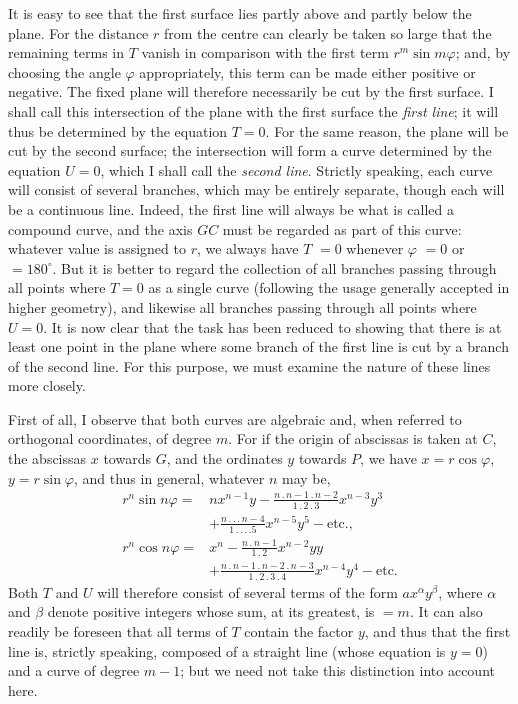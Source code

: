 It is easy to see that the first surface lies partly above and partly below the plane. For the distance $r$ from the centre can clearly be taken so large that the remaining terms in $T$ vanish in comparison with the first term $r^m\sin m\varphi$; and, by choosing the angle $\varphi$ appropriately, this term can be made either positive or negative. The fixed plane will therefore necessarily be cut by the first surface. I shall call this intersection of the plane with the first surface the \textit{first line}; it will thus be determined by the equation $T=0$. For the same reason, the plane will be cut by the second surface; the intersection will form a curve determined by the equation $U=0$, which I shall call the \textit{second line}. Strictly speaking, each curve will consist of several branches, which may be entirely separate, though each will be a continuous line. Indeed, the first line will always be what is called a compound curve, and the axis $GC$ must be regarded as part of this curve: whatever value is assigned to $r$, we always have $T$ $=0$ whenever $\varphi$ $=0$ or $=180^{\circ}$. But it is better to regard the collection of all branches passing through all points where $T=0$ as a single curve (following the usage generally accepted in higher geometry), and likewise all branches passing through all points where $U=0$. It is now clear that the task has been reduced to showing that there is at least one point in the plane where some branch of the first line is cut by a branch of the second line. For this purpose, we must examine the nature of these lines more closely.

First of all, I observe that both curves are algebraic and, when referred to orthogonal coordinates, of degree $m$. For if the origin of abscissas is taken at $C$, the abscissas $x$ towards $G$, and the ordinates $y$ towards $P$, we have $x=r\cos\varphi$, $y=r\sin\varphi$, and thus in general, whatever $n$ may be,
\[
\begin{aligned}
r^n\sin n\varphi={}&nx^{n-1}y-\frac{n\mathbin{.}n-1\mathbin{.}n-2}{1\mathbin{.}2\mathbin{.}3}x^{n-3}y^3\\
&+\frac{n\mathbin{.}\mathbin{.}\mathbin{.}n-4}{1\mathbin{.}\mathbin{.}\mathbin{.}\mathbin{.}5}x^{n-5}y^5-\text{etc.},\\
r^n\cos n\varphi={}&x^n-\frac{n\mathbin{.}n-1}{1\mathbin{.}2}x^{n-2}yy\\
&+\frac{n\mathbin{.}n-1\mathbin{.}n-2\mathbin{.}n-3}{1\mathbin{.}2\mathbin{.}3\mathbin{.}4}x^{n-4}y^4-\text{etc.}
\end{aligned}
\]
Both $T$ and $U$ will therefore consist of several terms of the form $ax^{\alpha}y^{\beta}$,
where $\alpha$ and $\beta$ denote positive integers whose sum, at its greatest, is $=m$. It can also readily be foreseen that all terms of $T$ contain the factor $y$, and thus that the first line is, strictly speaking, composed of a straight line (whose equation is $y=0$) and a curve of degree $m-1$; but we need not take this distinction into account here.


